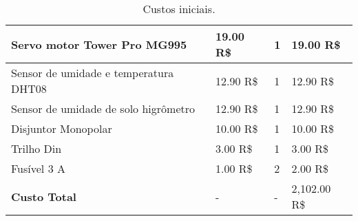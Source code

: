 \begin{table}[!htbp]
\begin{center}
\begin{tabular}{|p{4cm}|p{4cm}|p{3cm}|p{4cm}|}
Servo motor Tower Pro MG995 & 19.00 R\$ & 1 & 19.00 R\$\\\hline
Sensor de umidade e temperatura DHT08 & 12.90 R\$ & 1 & 12.90 R\$\\\hline
Sensor de umidade de solo higrômetro & 12.90 R\$ & 1 & 12.90 R\$\\\hline
Disjuntor Monopolar & 10.00 R\$ & 1 & 10.00 R\$\\\hline
Trilho Din & 3.00 R\$ & 1 & 3.00 R\$\\\hline
Fusível 3 A & 1.00 R\$ & 2 & 2.00 R\$\\\hline\hline
\textbf{Custo Total} & - & - & 2,102.00 R\$\\\hline
\end{tabular}
\caption{\label{tab:custos}Custos iniciais.}
\end{center}
\end{table}

